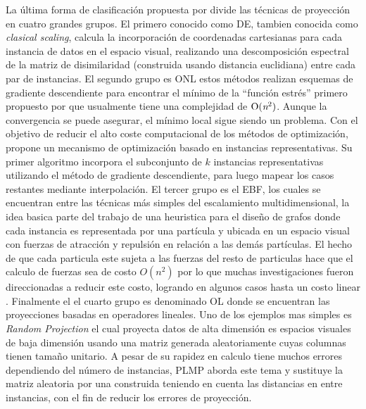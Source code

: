 La última forma de clasificación propuesta por  \cite{Paulovich2010Two} divide las técnicas de proyección en cuatro grandes grupos. El primero conocido como \ac{DE}, tambien conocida como \textit{clasical scaling}, calcula la incorporación de coordenadas cartesianas para cada instancia de datos en el espacio visual, realizando una descomposición espectral de la matriz de disimilaridad (construida usando distancia euclidiana) entre cada par de instancias.  El segundo grupo es \ac{ONL} estos métodos realizan esquemas de gradiente descendiente para encontrar el mínimo de  la ``función estrés'' primero propuesto por \cite{joseph1978multidimensional} que usualmente tiene una complejidad de $\mathrm{O(\emph{n}^2)}$. Aunque la convergencia se puede asegurar, el mínimo local sigue siendo un problema. Con el objetivo de reducir el alto coste computacional de los métodos de optimización,  \cite{pekalska1999new} propone un mecanismo de optimización basado en instancias representativas. Su primer algoritmo incorpora el subconjunto de $k$ instancias representativas utilizando el método de gradiente descendiente, para luego mapear los casos restantes mediante interpolación. El tercer grupo es el \ac{EBF}, los cuales se encuentran entre las técnicas más simples del escalamiento multidimensional, la idea basica parte del trabajo de una heuristica para el diseño de grafos \cite{di1994algorithms} donde cada instancia es representada por una partícula y ubicada en un espacio visual  con fuerzas de atracción y repulsión en relación a las demás partículas.  El hecho de que cada particula este sujeta a las fuerzas del resto de particulas hace que el calculo de fuerzas sea de costo $O(n^2)$  por lo que muchas investigaciones fueron direccionadas a reducir este costo, logrando en algunos casos hasta un costo linear \cite{chalmers1996linear}. Finalmente el el cuarto grupo es denominado \ac{OL} donde se encuentran las proyecciones basadas en operadores lineales. Uno de los ejemplos mas simples es \textit{Random Projection}  \cite{bingham2001random} el cual proyecta datos de alta dimensión es espacios visuales de baja dimensión usando una matriz generada aleatoriamente cuyas columnas tienen tamaño unitario. A pesar de su rapidez en calculo tiene muchos errores dependiendo del número de instancias, \ac{PLMP} \cite{Paulovich2010Two} aborda este tema y sustituye la matriz aleatoria por una construida teniendo  en cuenta las distancias en entre instancias, con el fin de reducir los errores de proyección.


